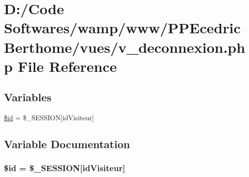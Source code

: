 \hypertarget{v__deconnexion_8php}{}\section{D\+:/\+Code Softwares/wamp/www/\+P\+P\+Ecedric\+Berthome/vues/v\+\_\+deconnexion.php File Reference}
\label{v__deconnexion_8php}
\subsection*{Variables}
\begin{DoxyCompactItemize}
\item 
\hyperlink{v__deconnexion_8php_ae97941710d863131c700f069b109991e}{\$id} = \$\+\_\+\+S\+E\+S\+S\+I\+ON\mbox{[}\textquotesingle{}id\+Visiteur\textquotesingle{}\mbox{]}
\end{DoxyCompactItemize}


\subsection{Variable Documentation}
\subsubsection[{\texorpdfstring{\$id}{$id}}]{\setlength{\rightskip}{0pt plus 5cm}\$id = \$\+\_\+\+S\+E\+S\+S\+I\+ON\mbox{[}\textquotesingle{}id\+Visiteur\textquotesingle{}\mbox{]}}\hypertarget{v__deconnexion_8php_ae97941710d863131c700f069b109991e}{}\label{v__deconnexion_8php_ae97941710d863131c700f069b109991e}
